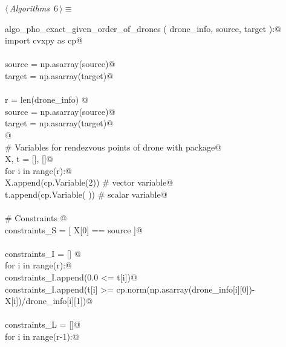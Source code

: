 \documentclass[10pt, english, oneside]{report}
\begin{document}
\begin{flushleft} \small
\begin{minipage}{\linewidth}\label{scrap2}\raggedright\small
{} $\langle\,${\itshape Algorithms}\nobreak\ {\footnotesize {6}}$\,\rangle\equiv$
\vspace{-1ex}
\begin{list}{}{} \item
\mbox{}\verb@def algo_pho_exact_given_order_of_drones ( drone_info, source, target ):@\\
\mbox{}\verb@    import cvxpy as cp@\\
\mbox{}\verb@@\\
\mbox{}\verb@    source = np.asarray(source)@\\
\mbox{}\verb@    target = np.asarray(target)@\\
\mbox{}\verb@@\\
\mbox{}\verb@    r = len(drone_info) @\\
\mbox{}\verb@    source = np.asarray(source)@\\
\mbox{}\verb@    target = np.asarray(target)@\\
\mbox{}\verb@    @\\
\mbox{}\verb@    # Variables for rendezvous points of drone with package@\\
\mbox{}\verb@    X, t = [], []@\\
\mbox{}\verb@    for i in range(r):@\\
\mbox{}\verb@       X.append(cp.Variable(2)) # vector variable@\\
\mbox{}\verb@       t.append(cp.Variable( )) # scalar variable@\\
\mbox{}\verb@@\\
\mbox{}\verb@    # Constraints @\\
\mbox{}\verb@    constraints_S = [  X[0] == source ]@\\
\mbox{}\verb@@\\
\mbox{}\verb@    constraints_I = [] @\\
\mbox{}\verb@    for i in range(r):@\\
\mbox{}\verb@      constraints_I.append(0.0 <= t[i])@\\
\mbox{}\verb@      constraints_I.append(t[i] >= cp.norm(np.asarray(drone_info[i][0])-X[i])/drone_info[i][1])@\\
\mbox{}\verb@@\\
\mbox{}\verb@    constraints_L = []@\\
\mbox{}\verb@    for i in range(r-1):@\\

\end{list}
\end{minipage}
\end{flushleft}
\end{document}
